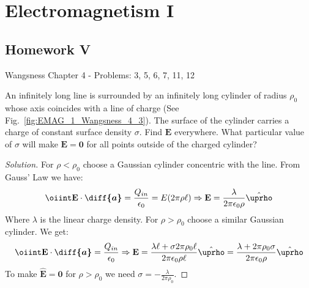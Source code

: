 \documentclass[crop=false,class=article,oneside]{standalone}
\begin{document}
    \ifx\ifphysicscourseselectromagnetismI\undefined
        \section*{Electromagnetism I}
        \setcounter{section}{5}
        \renewcommand\thefigure{%
            \arabic{section}.\arabic{figure}%
        }
        \renewcommand\thesubfigure{%
            \arabic{section}.\arabic{figure}.\arabic{subfigure}%
        }
    \fi
    \subsection{Homework V}
    Wangsness Chapter 4 - Problems: 3, 5, 6, 7, 11, 12
    \begin{problem}[Wangsness 4-3]
        \label{problem:EMAG_wangsness_4_3}
        An infinitely long line is surrounded by an infinitely
        long cylinder of radius $\rho_{0}$ whose axis coincides
        with a line of charge
        (See Fig.~\ref{fig:EMAG_1_Wangsness_4_3}). The surface
        of the  cylinder carries a charge of constant surface
        density $\sigma$. Find $\mathbf{E}$ everywhere. What
        particular value of $\sigma$ will make
        $\mathbf{E}=\mathbf{0}$
        for all points outside of the charged cylinder?
    \end{problem}
    \begin{proof}[Solution]
        For $\rho<\rho_0$ choose a Gaussian cylinder concentric
        with the line. From Gauss' Law we have:
        \begin{equation*}
            \oiint\mathbf{E}\cdot\boldsymbol{\diff{a}}
            =\frac{Q_{in}}{\epsilon_0}
            =E(2\pi\rho\ell)\Rightarrow
            \mathbf{E}
            =\frac{\lambda}{2\pi\epsilon_{0}\rho}
            \hat{\boldsymbol{\uprho}}
        \end{equation*}
        Where $\lambda$ is the linear charge density.
        For $\rho>\rho_{0}$ choose a similar
        Gaussian cylinder. We get:
        \begin{equation*}
            \oiint\mathbf{E}\cdot\boldsymbol{\diff{a}}
            =\frac{Q_{in}}{\epsilon_{0}}
            \Rightarrow\mathbf{E}
            =\frac{\lambda\ell+\sigma 2\pi\rho_{0}\ell}
            {2\pi\epsilon_{0}\rho\ell}\hat{\boldsymbol{\uprho}}
            =\frac{\lambda+2\pi\rho_{0}\sigma}
                  {2\pi\epsilon_{0}\rho}
            \hat{\boldsymbol{\uprho}}
        \end{equation*}
        To make $\hat{\mathbf{E}}=\mathbf{0}$
        for $\rho>\rho_{0}$ we need
        $\sigma=-\frac{\lambda}{2\pi\rho_{0}}$.
    \end{proof}
\end{document}
